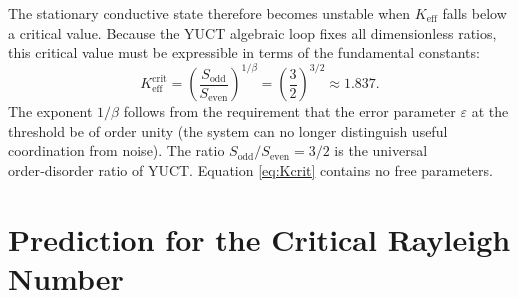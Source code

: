\documentclass[12pt,a4paper]{article}
\begin{document}
	The stationary conductive state therefore becomes unstable when \(K_{\mathrm{eff}}\) falls below a critical value.  Because the YUCT algebraic loop fixes all dimensionless ratios, this critical value must be expressible in terms of the fundamental constants:
	\begin{equation}\label{eq:Kcrit}
		K_{\mathrm{eff}}^{\mathrm{crit}} = \left( \frac{S_{\mathrm{odd}}}{S_{\mathrm{even}}} \right)^{1/\beta}
		= \left( \frac{3}{2} \right)^{3/2} \approx 1.837.
	\end{equation}
	The exponent \(1/\beta\) follows from the requirement that the error parameter \(\varepsilon\) at the threshold be of order unity (the system can no longer distinguish useful coordination from noise).  The ratio \(S_{\mathrm{odd}}/S_{\mathrm{even}} = 3/2\) is the universal order‑disorder ratio of YUCT.  Equation \eqref{eq:Kcrit} contains no free parameters.
	
	\section{Prediction for the Critical Rayleigh Number}
	
\end{document}
